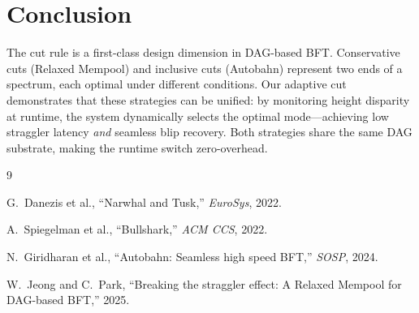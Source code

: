 \documentclass[sigconf,10pt,nonacm]{acmart}
\begin{document}
\vspace{-0.5em}
\section{Conclusion}
\vspace{-0.3em}

The cut rule is a first-class design dimension in DAG-based BFT. Conservative cuts (Relaxed Mempool) and inclusive cuts (Autobahn) represent two ends of a spectrum, each optimal under different conditions. Our adaptive cut demonstrates that these strategies can be unified: by monitoring height disparity at runtime, the system dynamically selects the optimal mode---achieving low straggler latency \emph{and} seamless blip recovery. Both strategies share the same DAG substrate, making the runtime switch zero-overhead.

\vspace{-0.5em}

\begin{thebibliography}{9}
\vspace{-0.3em}
\setlength{\itemsep}{0pt}

G.~Danezis et al., ``Narwhal and Tusk,'' \emph{EuroSys}, 2022.

A.~Spiegelman et al., ``Bullshark,'' \emph{ACM CCS}, 2022.

N.~Giridharan et al., ``Autobahn: Seamless high speed BFT,'' \emph{SOSP}, 2024.

W.~Jeong and C.~Park, ``Breaking the straggler effect: A Relaxed Mempool for DAG-based BFT,'' 2025.

\end{thebibliography}
\end{document}

